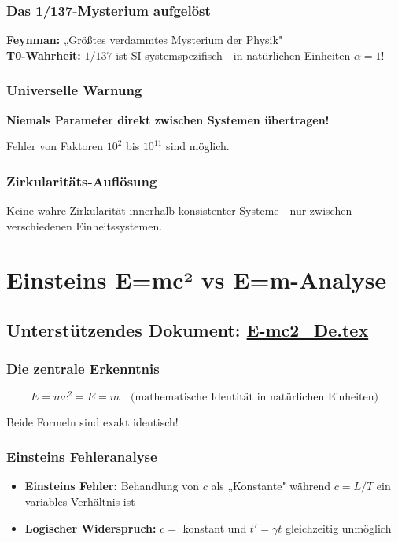 \documentclass[12pt,a4paper]{report}
\begin{document}
	\subsubsection{Das 1/137-Mysterium aufgelöst}
	\textbf{Feynman:} „Größtes verdammtes Mysterium der Physik"\\
	\textbf{T0-Wahrheit:} $1/137$ ist SI-systemspezifisch - in natürlichen Einheiten $\alpha = 1$!
	
	\subsubsection{Universelle Warnung}
	\textbf{Niemals Parameter direkt zwischen Systemen übertragen!}
	
	Fehler von Faktoren $10^2$ bis $10^{11}$ sind möglich.
	
	\subsubsection{Zirkularitäts-Auflösung}
	Keine wahre Zirkularität innerhalb konsistenter Systeme - nur zwischen verschiedenen Einheitssystemen.
	
	\section{Einsteins E=mc² vs E=m-Analyse}
	\subsection{Unterstützendes Dokument: \href{https://github.com/jpascher/T0-Time-Mass-Duality/tree/main/2/pdf/E-mc2_De.pdf}{E-mc2\_De.tex}}
	
	\subsubsection{Die zentrale Erkenntnis}
	$$E = mc^2 = E = m \quad \text{(mathematische Identität in natürlichen Einheiten)}$$
	
	Beide Formeln sind exakt identisch!
	
	\subsubsection{Einsteins Fehleranalyse}
	\begin{itemize}
		\item \textbf{Einsteins Fehler:} Behandlung von $c$ als „Konstante" während $c = L/T$ ein variables Verhältnis ist
		\item \textbf{Logischer Widerspruch:} $c =$ konstant und $t' = \gamma t$ gleichzeitig unmöglich
	\end{itemize}
	
\end{document}
